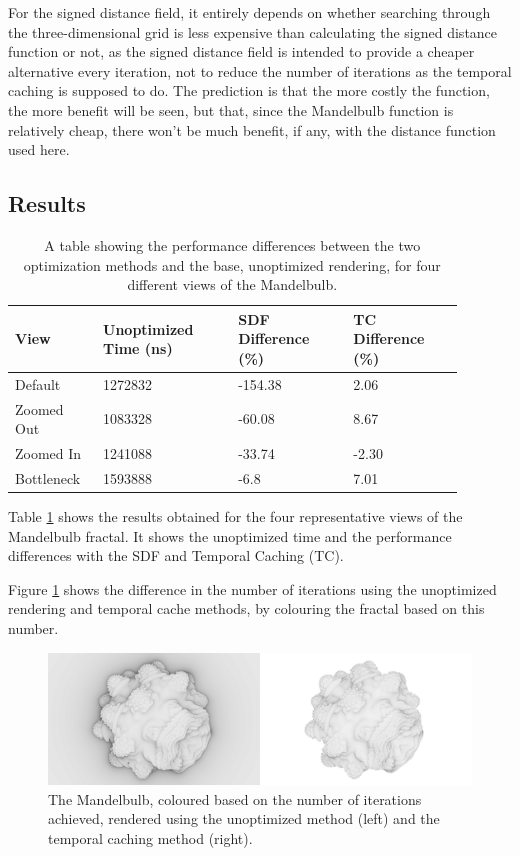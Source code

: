 For the signed distance field, it entirely depends on whether searching through the three-dimensional grid is less expensive than calculating the signed distance function or not, as the signed distance field is intended to provide a cheaper alternative every iteration, not to reduce the number of iterations as the temporal caching is supposed to do. The prediction is that the more costly the function, the more benefit will be seen, but that, since the Mandelbulb function is relatively cheap, there won't be much benefit, if any, with the distance function used here.

\subsection{Results}

\begin{table}[ht]
	\centering
	\begin{tabular}{||p{0.17\linewidth}|p{0.27\linewidth}|p{0.23\linewidth}|p{0.22\linewidth}||}
		\hline
		View & Unoptimized Time (ns) & SDF Difference (\%) & TC Difference (\%)\\
		\hline\hline
		Default & 1272832 & -154.38 & 2.06\\
		\hline
		Zoomed Out & 1083328 & -60.08 & 8.67\\
		\hline
		Zoomed In & 1241088 & -33.74 & -2.30\\
		\hline
		Bottleneck & 1593888 & -6.8 & 7.01\\
		\hline
	\end{tabular}
	\caption{A table showing the performance differences between the two optimization methods and the base, unoptimized rendering, for four different views of the Mandelbulb.}
	\label{table:mandelbulb-static-results}
\end{table}

Table \ref{table:mandelbulb-static-results} shows the results obtained for the four representative views of the Mandelbulb fractal. It shows the unoptimized time and the performance differences with the SDF and Temporal Caching (TC).\newline

Figure \ref{figure:mandelbulb-ao-results} shows the difference in the number of iterations using the unoptimized rendering and temporal cache methods, by colouring the fractal based on this number.

\begin{figure}[ht]
	\centering
	\includegraphics[width=\linewidth, frame]{Images/Results/Mandelbulb-AO-Results.png}
	\caption{The Mandelbulb, coloured based on the number of iterations achieved, rendered using the unoptimized method (left) and the temporal caching method (right).}
	\label{figure:mandelbulb-ao-results}
\end{figure}

